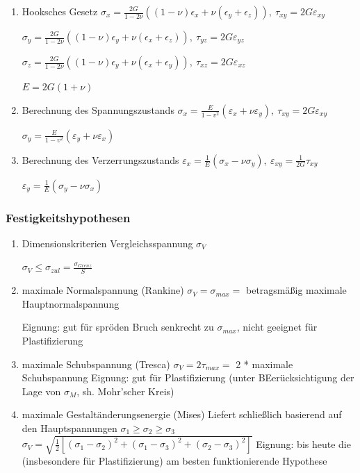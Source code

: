 \documentclass[11pt]{article}
\begin{document}
\begin{enumerate}
\item Hooksches Gesetz
\label{sec:org82e699f}
\(\sigma_x = \frac{2G}{1-2\nu}((1-\nu)\epsilon_x + \nu(\epsilon_y+\epsilon_z)), \ \tau_{xy} = 2G\varepsilon_{xy}\)

\(\sigma_y = \frac{2G}{1-2\nu}((1-\nu)\epsilon_y + \nu(\epsilon_x+\epsilon_z)), \ \tau_{yz} = 2G\varepsilon_{yz}\)

\(\sigma_z = \frac{2G}{1-2\nu}((1-\nu)\epsilon_y + \nu(\epsilon_x+\epsilon_y)), \ \tau_{xz} = 2G\varepsilon_{xz}\)

\(E = 2G(1+\nu)\)
\item Berechnung des Spannungszustands
\label{sec:org6d6de63}
\(\sigma_x = \frac{E}{1-v^2}(\varepsilon_x + \nu \varepsilon_y),  \ \tau_{xy} = 2G\varepsilon_{xy}\)

\(\sigma_y = \frac{E}{1-v^2}(\varepsilon_y + \nu \varepsilon_x)\)

\item Berechnung des Verzerrungszustands
\label{sec:orgf5d8712}
\(\varepsilon_x = \frac{1}{E}(\sigma_x - \nu \sigma_y), \ \varepsilon_{xy} = \frac{1}{2G}\tau_{xy}\)

\(\varepsilon_y = \frac{1}{E}(\sigma_y - \nu \sigma_x)\)
\end{enumerate}

\subsubsection{Festigkeitshypothesen}
\label{sec:orga4c961b}
\begin{enumerate}
\item Dimensionskriterien
\label{sec:orgd9023aa}
Vergleichsspannung \(\sigma_V\)

\(\sigma_V \leq \sigma_{zul} = \frac{\sigma_{Grenz}}{S}\)
\item maximale Normalspannung (Rankine)
\label{sec:org2851df0}
\(\sigma_V = \sigma_{max} =\) betragsmäßig maximale Hauptnormalspannung

Eignung: gut für spröden Bruch senkrecht zu \(\sigma_{max}\), nicht geeignet für Plastifizierung

\item maximale Schubspannung (Tresca)
\label{sec:org4233343}
\(\sigma_V = 2\tau_{max} =\) 2 * maximale Schubspannung
Eignung: gut für Plastifizierung (unter BEerücksichtigung der Lage von \(\sigma_M\), sh. Mohr’scher Kreis)

\item maximale Gestaltänderungsenergie (Mises)
\label{sec:orgff0501e}
Liefert schließlich basierend auf den Hauptspannungen \(\sigma_1 \geq \sigma_2 \geq \sigma_3\)
\(\sigma_V = \sqrt{\frac{1}{2} [(\sigma_1 - \sigma_2)^2 + (\sigma_1 - \sigma_3)^2 + (\sigma_2 - \sigma_3)^2]}\)
Eignung: bis heute die (insbesondere für Plastifizierung) am besten funktionierende Hypothese
\end{enumerate}
\end{document}
